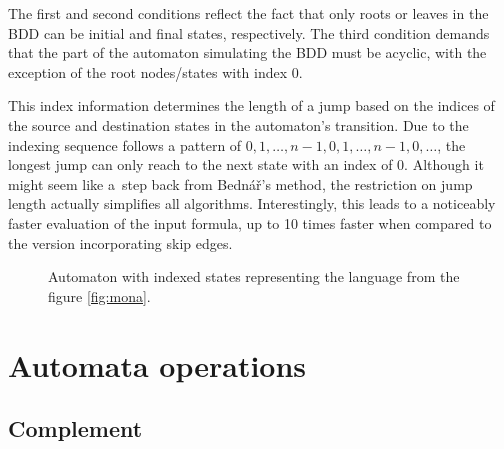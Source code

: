 \documentclass[pdflatex,sn-mathphys-num]{sn-jnl}%
\theoremstyle{thmstyleone}%
\theoremstyle{thmstyletwo}%
\theoremstyle{thmstylethree}%
\begin{document}
        The first and second conditions reflect the fact that only roots or leaves in the BDD can be initial and final states, respectively. The third condition demands that the part of the automaton simulating the BDD must be acyclic, with the exception of the root nodes/states with index 0.

        This index information determines the length of a jump based on the indices of the source and destination states in the automaton's transition. Due to the indexing sequence follows a pattern of $0, 1, \dots, n-1, 0, 1, \dots, n-1, 0, \dots$, the longest jump can only reach to the next state with an index of $0$. Although it might seem like a~step back from Bednář's method, the restriction on jump length actually simplifies all algorithms. Interestingly, this leads to a noticeably faster evaluation of the input formula, up to 10 times faster when compared to the version incorporating skip edges.

        \begin{figure}[H]
            \centering
            \caption{Automaton with indexed states representing the language from the figure \ref{fig:mona}.}
        \end{figure}

\section{Automata operations}
    \subsection{Complement}
\end{document}
